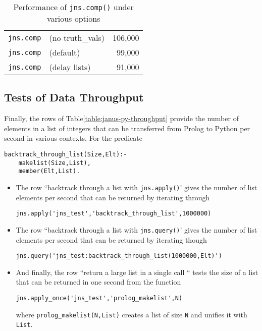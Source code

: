 \begin{table}[hbt] \label{table:janus-py-comp}
  \begin{centering}
\begin{tabular}{llr} \hline
{\tt jns.comp}            & (no truth\_vals)  &    106,000\\
{\tt jns.comp}            & (default)         &     99,000\\
{\tt jns.comp}            & (delay lists)     &     91,000\\ \hline
\end{tabular}        
\caption{Performance of {\tt jns.comp()} under various options}
  \end{centering}
\end{table}

\subsection{Tests of Data Throughput}
Finally, the rows of Table\ref{table:janus-py-throughput} provide the
number of elements in a list of integers that can be transferred from
Prolog to Python per second in various contexts.  For the predicate
\begin{verbatim}
backtrack_through_list(Size,Elt):-
    makelist(Size,List),
    member(Elt,List).
\end{verbatim}
\begin{itemize}
\item The row ``backtrack through a list with {\tt jns.apply()}' gives
  the number of list elements per second that can be returned by
  iterating through
\begin{verbatim}
jns.apply('jns_test','backtrack_through_list',1000000)
\end{verbatim}
\item The row ``backtrack through a list with {\tt jns.query()}' gives
  the number of list elements per second that can be returned by
  iterating though
\begin{verbatim}
jns.query('jns_test:backtrack_through_list(1000000,Elt)')
\end{verbatim}
\item And finally, the row ``return a large list in a single call ``
  tests the size of a list that can be returned in one second from the
  function
\begin{verbatim}
jns.apply_once('jns_test','prolog_makelist',N)    
\end{verbatim}
where {\tt prolog\_makelist(N,List)} creates a list of size {\tt N}
and unifies it with {\tt List}.
\end{itemize}

